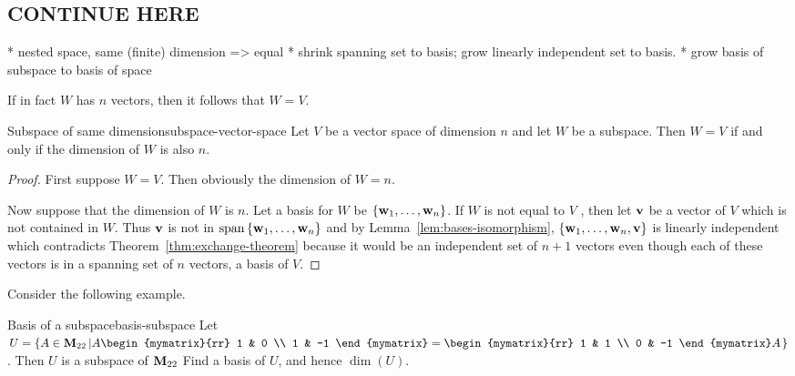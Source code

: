 \subsection{CONTINUE HERE}

* nested space, same (finite) dimension => equal
* shrink spanning set to basis; grow linearly independent set to basis.
* grow basis of subspace to basis of space



If in fact $W$ has $n$ vectors, then it follows that $W=V$.

\begin{theorem}{Subspace of same dimension}{subspace-vector-space}
  Let $V$ be a vector space of dimension $n$ and let $W$ be a
  subspace. Then $W=V$ if and only if the dimension of $W$ is also
  $n$.
\end{theorem}

\begin{proof}
  First suppose $W=V$. Then obviously the dimension of $W=n$.

  Now suppose that the dimension of $W$ is $n$. Let a basis for $W$ be
  $ \left\{\mbox{\bf w}_{1},\ldots,\mbox{\bf w}_{n}\right\}$. If $W$ is not equal to
  $V$ , then let $\mbox{\bf v}$ be a vector of $V$ which is not contained
  in $W$. Thus $ \mbox{\bf v}$ is not in
  $\sspan\set{\vect{w}_{1},\ldots,\vect{w} _{n}} $ and by
  Lemma~\ref{lem:bases-isomorphism},
  $\left\{\mbox{\bf w}_{1},\ldots,\mbox{\bf w}_{n},\mbox{\bf v}\right\} $ is linearly
  independent which contradicts Theorem~\ref{thm:exchange-theorem}
  because it would be an independent set of $n+1$ vectors even though
  each of these vectors is in a spanning set of $n$ vectors, a basis
  of $V$.
\end{proof}

Consider the following example.

\begin{example}{Basis of a subspace}{basis-subspace}
  Let $U=\set{A\in\Mat_{22} \left\vert
      A\begin{mymatrix}{rr}
        1 & 0 \\ 1 & -1 \end{mymatrix}
      = \begin{mymatrix}{rr}
        1 & 1 \\ 0 & -1 \end{mymatrix} A \right.}$.
  Then $U$ is a subspace of $\mathbf{M}_{22}$
  Find a basis of $U$, and hence $\dim(U)$.
\end{example}

